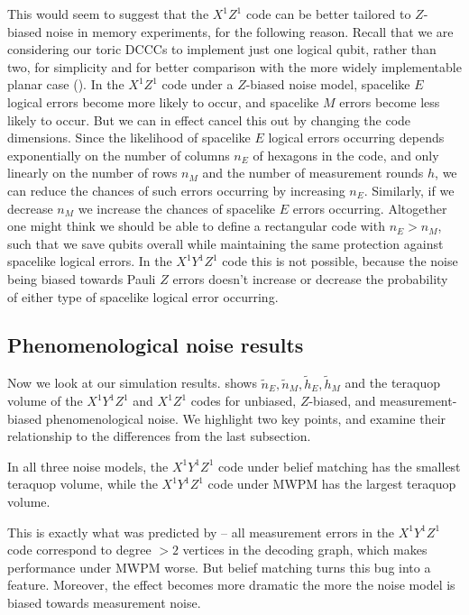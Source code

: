 This would seem to suggest that the $X^1 Z^1$ code can be better tailored to $Z$-biased noise in memory experiments,
for the following reason.
Recall that we are considering our toric DCCCs to implement just one logical qubit, rather than two, for simplicity and for better comparison with the more widely implementable planar case ().
In the $X^1 Z^1$ code under a $Z$-biased noise model, spacelike $E$ logical errors become more likely to occur,
and spacelike $M$ errors become less likely to occur.
But we can in effect cancel this out by changing the code dimensions.
Since the likelihood of spacelike $E$ logical errors occurring depends exponentially on the number of columns $n_E$ of hexagons in the code, and only linearly on the number of rows $n_M$ and the number of measurement rounds $h$, we can reduce the chances of such errors occurring by increasing $n_E$.
Similarly, if we decrease $n_M$ we increase the chances of spacelike $E$ errors occurring.
Altogether one might think we should be able to define a rectangular code with $n_E > n_M$,
such that we save qubits overall while maintaining the same protection against spacelike logical errors.
In the $X^1 Y^1 Z^1$ code this is not possible, because the noise being biased towards Pauli $Z$ errors doesn't increase or decrease the probability of either type of spacelike logical error occurring.

\subsection{Phenomenological noise results}\label{subsec:unrepetaed-phenomenological-noise}

Now we look at our simulation results.
 shows $\tilde{n}_E, \tilde{n}_M, \tilde{h}_E, \tilde{h}_M$ and the teraquop volume of the $X^1Y^1Z^1$ and $X^1Z^1$ codes for unbiased, $Z$-biased, and measurement-biased phenomenological noise.
We highlight two key points, and examine their relationship to the differences from the last subsection.

\begin{keypoint}\label{key:XYZ_XZ_best_and_worst}
In all three noise models, the $X^1 Y^1 Z^1$ code under belief matching has the smallest teraquop volume,
while the $X^1 Y^1 Z^1$ code under MWPM has the largest teraquop volume.
\end{keypoint}

This is exactly what was predicted by  -- all measurement errors in the $X^1 Y^1 Z^1$ code correspond to degree $> 2$ vertices in the decoding graph, which makes performance under MWPM worse.
But belief matching turns this bug into a feature.
Moreover, the effect becomes more dramatic the more the noise model is biased towards measurement noise.

